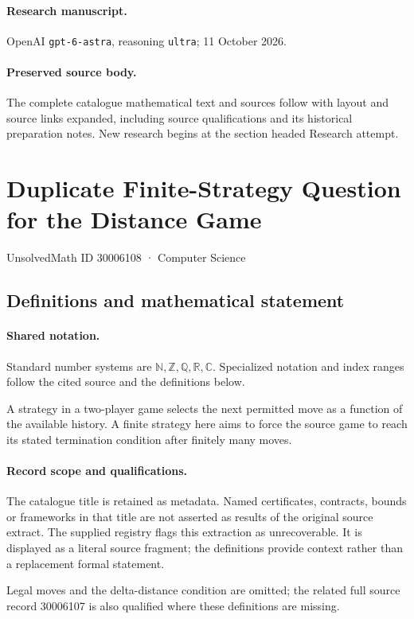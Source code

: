 \documentclass[11pt]{article}
\begin{document}
\paragraph{Research manuscript.} OpenAI \texttt{gpt-6-astra}, reasoning \texttt{ultra}; 11 October 2026.
\paragraph{Preserved source body.} The complete catalogue mathematical text and sources follow with layout and source links expanded, including source qualifications and its historical preparation notes. New research begins at the section headed Research attempt.

\section{Duplicate Finite-Strategy Question for the Distance Game}\label{30006108}
{\small UnsolvedMath ID 30006108 · Computer Science}
\subsection{Definitions and mathematical statement}

\paragraph{Shared notation.}Standard number systems are $\mathbb N,\mathbb Z,\mathbb Q,\mathbb R,\mathbb C$. Specialized notation and index ranges follow the cited source and the definitions below.


A strategy in a two-player game selects the next permitted move as a function of the available history. A finite strategy here aims to force the source game to reach its stated termination condition after finitely many moves.
\paragraph{Record scope and qualifications.}
The catalogue title is retained as metadata. Named certificates, contracts, bounds or frameworks in that title are not asserted as results of the original source extract.
The supplied registry flags this extraction as unrecoverable. It is displayed as a literal source fragment; the definitions provide context rather than a replacement formal statement.

Legal moves and the delta-distance condition are omitted; the related full source record 30006107 is also qualified where these definitions are missing.
\end{document}
